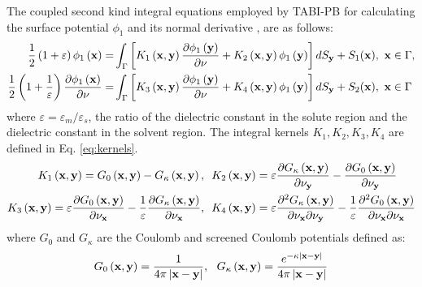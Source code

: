 \documentclass[11pt,titlepage]{article}
\begin{document}
The coupled second kind integral equations employed by TABI-PB for calculating the surface potential $\phi_1$ and its normal derivative \cite{Juffer1991}, are as follows: 
%
\begin{equation}\label{eq:integraleq}
\begin{split}
\frac{1}{2}\left(1+\varepsilon\right)\phi_1\left({\bf x}\right) =& \int_\Gamma\left[K_1\left({\bf x}, {\bf y}\right) \frac{\partial \phi_1\left({\bf y}\right)}{\partial \nu} + K_2\left({\bf x}, {\bf y}\right) \phi_1\left({\bf y}\right) \right]dS_{\bf y} + S_1({\bf x}), \ {\bf x} \in \Gamma, \\ %
\frac{1}{2}\left(1+\frac{1}{\varepsilon}\right) \frac{\partial \phi_1\left({\bf x}\right)}{\partial \nu} =& \int_\Gamma\left[K_3\left({\bf x}, {\bf y}\right) \frac{\partial \phi_1\left({\bf y}\right)}{\partial \nu} + K_4\left({\bf x}, {\bf y}\right) \phi_1\left({\bf y}\right) \right]dS_{\bf y} + S_2({\bf x}), \ {\bf x} \in \Gamma 
\end{split} \end{equation} 
%
where $\varepsilon = \varepsilon_m / \varepsilon_s$, the ratio of the dielectric constant in the solute region and the dielectric constant in the solvent region. The integral kernels $K_1, K_2, K_3, K_4$ are defined in Eq. \ref{eq:kernels}.
%
\begin{equation}
\begin{split}
K_1\left({\bf x}, {\bf y}\right) = G_0\left({\bf x}, {\bf y}\right) - G_\kappa\left({\bf x}, {\bf y}\right),& \ \ K_2\left({\bf x}, {\bf y}\right) = \varepsilon \frac{\partial G_\kappa\left({\bf x}, {\bf y}\right)}{\partial \nu_{\bf y}}
-\frac{\partial G_0\left({\bf x}, {\bf y}\right)}{\partial \nu_{\bf y}} \\ K_3\left({\bf x}, {\bf y}\right) = \varepsilon \frac{\partial G_0\left({\bf x}, {\bf y}\right)}{\partial \nu_{\bf x}}
-\frac{1}{\varepsilon}\frac{\partial G_\kappa\left({\bf x}, {\bf y}\right)}{\partial \nu_{\bf x}},& \ \ K_4\left({\bf x}, {\bf y}\right) = \varepsilon \frac{\partial^2 G_\kappa\left({\bf x}, {\bf y}\right)}{\partial \nu_{\bf x} \partial \nu_{\bf y}}
-\frac{1}{\varepsilon}\frac{\partial^2 G_0\left({\bf x}, {\bf y}\right)}{\partial \nu_{\bf x} \partial \nu_{\bf x}}
\label{eq:kernels}
\end{split} \end{equation}
%
where $G_0$ and $G_\kappa$ are the Coulomb and screened Coulomb potentials defined as:
%
\begin{equation}
G_0\left({\bf x}, {\bf y}\right) = \frac{1}{4\pi \left|{\bf x} - {\bf y}\right|}, \ \ G_\kappa\left({\bf x}, {\bf y}\right) = \frac{e^{-\kappa\left|{\bf x} - {\bf y}\right|}}{4\pi \left|{\bf x} - {\bf y}\right|} 
\end{equation}
\end{document}
